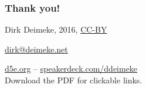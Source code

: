 \documentclass[t,handout,aspectratio=169]{beamer}
\begin{document}
\begin{frame}[fragile]\frametitle{Thank you!}
    \vfill
    \begin{center}
        Dirk Deimeke, 2016, \href{https://creativecommons.org/licenses/by/4.0/}{CC-BY}

        \href{mailto:dirk@deimeke.net}{dirk@deimeke.net}

        \href{https://d5e.org/}{d5e.org} -- \href{https://speakerdeck.com/ddeimeke/}{speakerdeck.com/ddeimeke} \\
        {\tiny Download the PDF for clickable links.}
    \end{center}
\end{frame}
\end{document}
